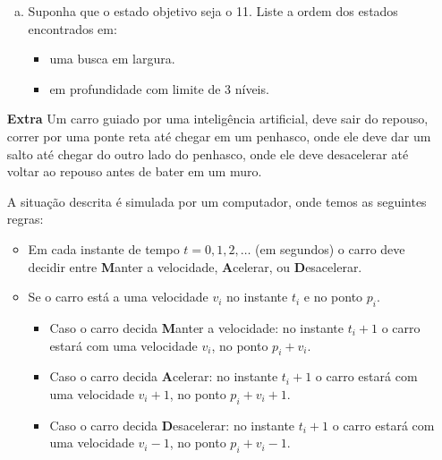 \documentclass[12pt]{article}
\begin{document}
\begin{enumerate}
\begin{enumerate}[a)]
\item Suponha que o estado objetivo seja o 11. Liste a ordem dos estados encontrados em:

\begin{itemize}

\item uma busca em largura.

\item em profundidade com limite de 3 níveis.

\end{itemize}

\end{enumerate}





\break


\item[\textbf{Extra}] Um carro guiado por uma inteligência artificial, deve sair do repouso, correr por uma ponte reta até chegar em um penhasco, onde ele deve dar um salto até chegar do outro lado do penhasco, onde ele deve desacelerar até voltar ao repouso antes de bater em um muro. 

A situação descrita é simulada por um computador, onde temos as seguintes regras:

\begin{itemize}

\item Em cada instante de tempo $t = 0, 1, 2, \dots$ (em segundos) o carro deve decidir entre \textbf{M}anter a velocidade, \textbf{A}celerar, ou \textbf{D}esacelerar. 

\item Se o carro está a uma velocidade $v_i$ no instante $t_i$ e no ponto $p_i$. 

\begin{itemize}

\item Caso o carro decida \textbf{M}anter a velocidade: no instante $t_i+1$ o carro estará com uma velocidade $v_i$, no ponto $p_i+v_i$. 

\item Caso o carro decida \textbf{A}celerar: no instante $t_i+1$ o carro estará com uma velocidade $v_i+1$, no ponto $p_i+v_i+1$. 

\item Caso o carro decida \textbf{D}esacelerar: no instante $t_i+1$ o carro estará com uma velocidade $v_i-1$, no ponto $p_i+v_i-1$. 


\end{itemize}
\end{itemize}
\end{enumerate}
\end{document}
